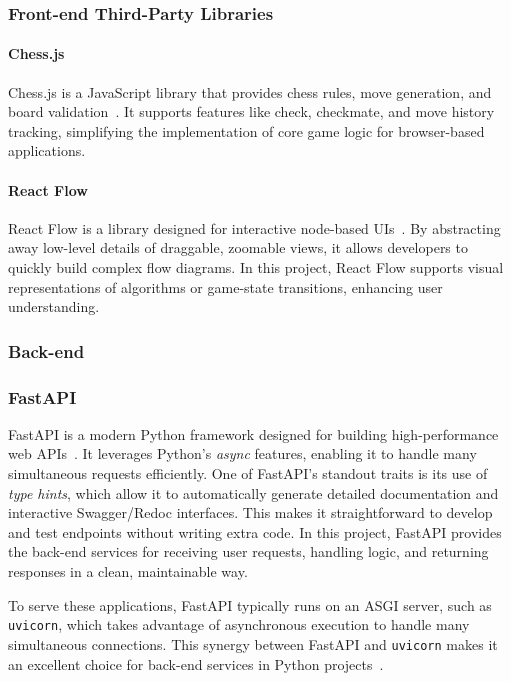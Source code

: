 \documentclass[12pt,a4paper]{article}
\begin{document}
\subsubsection*{Front-end Third-Party Libraries}
\paragraph{Chess.js}
Chess.js is a JavaScript library that provides chess rules, move generation, and board
validation~\cite{chessjs}. It supports features like check, checkmate, and move history tracking, simplifying the implementation of core game logic for browser-based applications.

\paragraph{React Flow}
React Flow is a library designed for interactive node-based UIs~\cite{reactflowDocs}. By abstracting away low-level details of draggable, zoomable views, it allows developers to quickly build complex flow diagrams. In this project, React Flow supports visual representations of algorithms or game-state transitions, enhancing user understanding.

\subsubsection{Back-end}
\subsubsection*{FastAPI}
FastAPI is a modern Python framework designed for building high-performance web APIs~\cite{fastapiDocs}. It leverages Python's \emph{async} features, enabling it to handle many simultaneous requests efficiently. One of FastAPI’s standout traits is its use of \emph{type hints}, which allow it to automatically generate detailed documentation and interactive Swagger/Redoc interfaces. This makes it straightforward to develop and test endpoints without writing extra code. In this project, FastAPI provides the back-end services for receiving user requests, handling logic, and returning responses in a clean, maintainable way.

To serve these applications, FastAPI typically runs on an ASGI server, such as \texttt{uvicorn}, which takes advantage of asynchronous execution to handle many simultaneous connections. This synergy between FastAPI and \texttt{uvicorn} makes it an excellent choice for back-end services in Python projects~\cite{uvicornDocs}.
\end{document}
